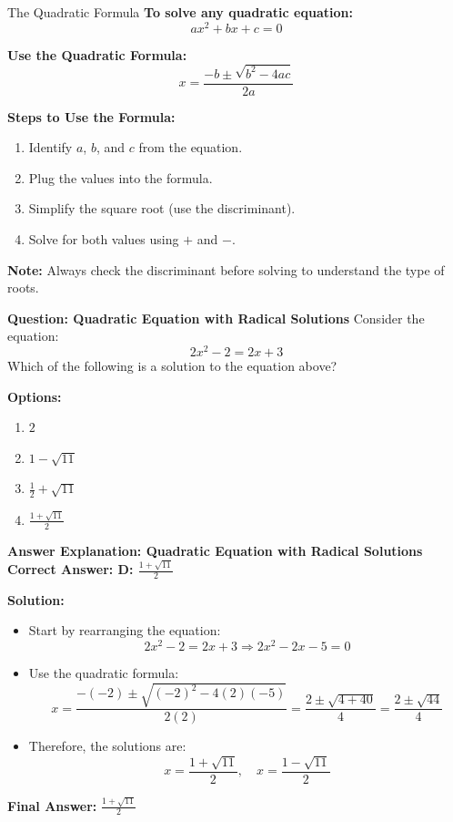 \documentclass{beamer}
\begin{document}
\begin{frame}{The Quadratic Formula}
\textbf{To solve any quadratic equation:}
\[
ax^2 + bx + c = 0
\]

\textbf{Use the Quadratic Formula:}
\[
x = \frac{-b \pm \sqrt{b^2 - 4ac}}{2a}
\]

\textbf{Steps to Use the Formula:}
\begin{enumerate}
    \item Identify $a$, $b$, and $c$ from the equation.
    \item Plug the values into the formula.
    \item Simplify the square root (use the discriminant).
    \item Solve for both values using $+$ and $-$.
\end{enumerate}

\textbf{Note:} Always check the discriminant before solving to understand the type of roots.
\end{frame}


\begin{frame}{\textbf{Question: Quadratic Equation with Radical Solutions}}
    Consider the equation:
    \[
    2x^2 - 2 = 2x + 3
    \]
    Which of the following is a solution to the equation above?

    \vspace{0.3cm}
    \textbf{Options:}
    \begin{enumerate}
        \item[A] \(2\)
        \item[B] \(1 - \sqrt{11}\)
        \item[C] \(\frac{1}{2} + \sqrt{11}\)
        \item[D] \(\frac{1 + \sqrt{11}}{2}\)
    \end{enumerate}
\end{frame}

\begin{frame}{\textbf{Answer Explanation: Quadratic Equation with Radical Solutions}}
    \textbf{Correct Answer: \textcolor{novelGreen}{D: \( \frac{1 + \sqrt{11}}{2} \)}}

    \vspace{0.3cm}
    \textbf{Solution:}
    \begin{itemize}
        \item Start by rearranging the equation:
        \[
        2x^2 - 2 = 2x + 3 \Rightarrow 2x^2 - 2x - 5 = 0
        \]
        \item Use the quadratic formula:
        \[
        x = \frac{-(-2) \pm \sqrt{(-2)^2 - 4(2)(-5)}}{2(2)} = \frac{2 \pm \sqrt{4 + 40}}{4} = \frac{2 \pm \sqrt{44}}{4}
        \]
        \item Therefore, the solutions are:
        \[
        x = \frac{1 + \sqrt{11}}{2}, \quad x = \frac{1 - \sqrt{11}}{2}
        \]
    \end{itemize}

    \textbf{Final Answer:} \( \boxed{\frac{1 + \sqrt{11}}{2}} \)
\end{frame}
\end{document}
